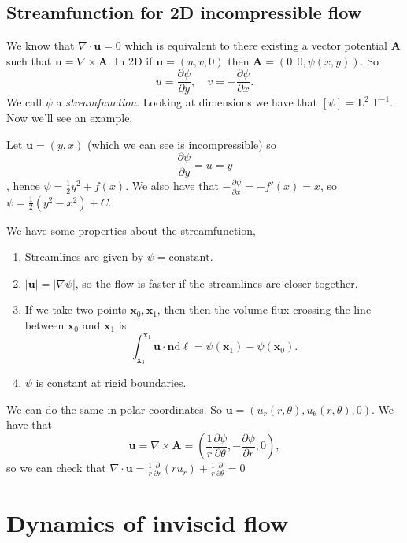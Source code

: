 \documentclass{article}
\begin{document}
\subsection{Streamfunction for 2D incompressible flow}
We know that $ \nabla\cdot \mathbf u = 0 $ which is equivalent to there existing a vector potential $ \mathbf A $ such that $ \mathbf u = \nabla\times \mathbf A $. In 2D if $ \mathbf u = (u,v,0) $ then $ \mathbf A = (0,0,\psi(x,y)) $. So
\[
	u=\frac{\partial \psi}{\partial y},\quad v = -\frac{\partial \psi}{\partial x}.
\]
We call $ \psi $ a \textit{streamfunction}. Looking at dimensions we have that $ [\psi]=\mathrm{L}^2 \ \mathrm{T}^{-1} $. Now we'll see an example.\par
Let $ \mathbf u = (y,x) $ (which we can see is incompressible) so 
\[
	\frac{\partial\psi}{\partial y} = u = y
\],
hence $ \psi = \frac 12 y^2 + f(x) $. We also have that $ -\frac{\partial \psi}{\partial x}=-f'(x)=x $, so $ \psi = \frac 12(y^2-x^2)+C $.\par
We have some properties about the streamfunction,
\begin{enumerate}
	\item Streamlines are given by $ \psi=\text{constant} $.
	\item $ |\mathbf u| = |\nabla\psi| $, so the flow is faster if the streamlines are closer together.
	\item If we take two points $ \mathbf x_0,\mathbf x_1 $, then then the volume flux crossing the line between $ \mathbf x_0 $ and $ \mathbf x_1 $ is
		\[
			\int_{\mathbf x_0}^{\mathbf x_1} \mathbf u \cdot \mathbf n \mathrm d\ell = \psi(\mathbf x_1)-\psi(\mathbf x_0).
		\]
	\item $ \psi $ is constant at rigid boundaries.
\end{enumerate}
We can do the same in polar coordinates. So $ \mathbf u = (u_r(r,\theta), u_\theta(r,\theta),0) $. We have that
\[
	\mathbf u = \nabla\times \mathbf A =\left(\frac 1r\frac{\partial \psi}{\partial\theta}, -\frac{\partial \psi}{\partial r},0\right),
\]
so we can check that $ \nabla\cdot\mathbf u = \frac 1r\frac{\partial}{\partial r}(ru_r)+\frac1r \frac{\partial}{\partial \theta}=0 $
\section{Dynamics of inviscid flow}
\end{document}

